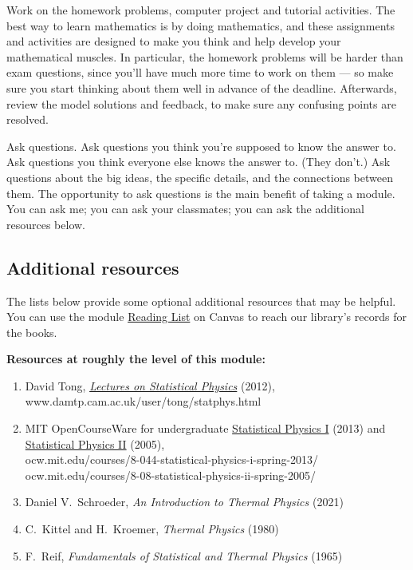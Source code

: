 Work on the homework problems, computer project and tutorial activities.
The best way to learn mathematics is by doing mathematics, and these assignments and activities are designed to make you think and help develop your mathematical muscles.
In particular, the homework problems will be harder than exam questions, since you'll have much more time to work on them --- so make sure you start thinking about them well in advance of the deadline.
Afterwards, review the model solutions and feedback, to make sure any confusing points are resolved.

Ask questions.
Ask questions you think you're supposed to know the answer to.
Ask questions you think everyone else knows the answer to.
(They don't.)
Ask questions about the big ideas, the specific details, and the connections between them.
The opportunity to ask questions is the main benefit of taking a module.
You can ask me; you can ask your classmates; you can ask the additional resources below.


\subsection*{Additional resources}
The lists below provide some optional additional resources that may be helpful.
You can use the module \href{https://canvas.liverpool.ac.uk/courses/69036/external_tools/102}{Reading List} on Canvas to reach our library's records for the books.

\noindent\textbf{Resources at roughly the level of this module:} \\[-24 pt]
\begin{enumerate}
  \item David Tong, \href{https://www.damtp.cam.ac.uk/user/tong/statphys.html}{\textit{Lectures on Statistical Physics}} (2012), \\ www.damtp.cam.ac.uk/user/tong/statphys.html
  \item MIT OpenCourseWare for undergraduate \href{https://ocw.mit.edu/courses/8-044-statistical-physics-i-spring-2013/}{Statistical Physics I} (2013) and \href{https://ocw.mit.edu/courses/8-08-statistical-physics-ii-spring-2005/}{Statistical Physics II} (2005), \\ ocw.mit.edu/courses/8-044-statistical-physics-i-spring-2013/ \\ ocw.mit.edu/courses/8-08-statistical-physics-ii-spring-2005/
  \item Daniel V.~Schroeder, \textit{An Introduction to Thermal Physics} (2021)
  \item C.~Kittel and H.~Kroemer, \textit{Thermal Physics} (1980)
  \item F.~Reif, \textit{Fundamentals of Statistical and Thermal Physics} (1965)
\end{enumerate}

